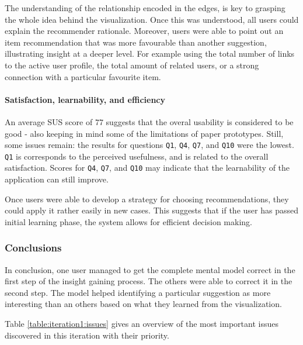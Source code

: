 The understanding of the relationship encoded in the edges, is key to grasping the whole idea behind the visualization. Once this was understood, all users could explain the recommender rationale. Moreover, users were able to point out an item recommendation that was more favourable than another suggestion, illustrating insight at a deeper level. For example using the total number of links to the active user profile, the total amount of related users, or a strong connection with a particular favourite item.


\paragraph{Satisfaction, learnability, and efficiency}

An average SUS score of $77$ suggests that the overal usability is considered to be good - also keeping in mind some of the limitations of paper prototypes. Still, some issues remain: the results for questions \texttt{Q1}, \texttt{Q4}, \texttt{Q7}, and \texttt{Q10} were the lowest. \texttt{Q1} is corresponds to the perceived usefulness, and is related to the overall satisfaction. Scores for \texttt{Q4}, \texttt{Q7}, and \texttt{Q10} may indicate that the learnability of the application can still improve.

Once users were able to develop a strategy for choosing recommendations, they could apply it rather easily in new cases. This suggests that if the user has passed initial learning phase, the system allows for efficient decision making.


\subsubsection{Conclusions}\label{chapter:prototype:section:paper:conclusion}


In conclusion, one user managed to get the complete mental model correct in the first step of the insight gaining process. The others were able to correct it in the second step. The model helped identifying a particular suggestion as more interesting than an others based on what they learned from the visualization.

Table \ref{table:iteration1:issues} gives an overview of the most important issues discovered in this iteration with their priority.

